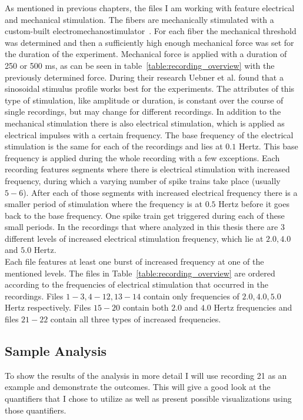 As mentioned in previous chapters, the files I am working with feature electrical and mechanical stimulation. The fibers are mechanically stimulated with a custom-built electromechanostimulator~\cite{roberto}. For each fiber the mechanical threshold was determined and then a sufficiently high enough mechanical force was set for the duration of the experiment.
Mechanical force is applied with a duration of 250 or 500 ms, as can be seen in table~\ref{table:recording_overview} with the previously determined force. During their research Uebner et al. found that a sinosoidal stimulus profile works best for the experiments. The attributes of this type of stimulation, like amplitude or duration, is constant over the course of single recordings, but may change  for different recordings. In addition to the mechanical stimulation there is also electrical stimulation, which is applied as electrical impulses with a certain frequency. The base frequency of the electrical stimulation is the same for each of the recordings and lies at $0.1$ Hertz. This base frequency is applied during the whole recording with a few exceptions. Each recording features segments where there is electrical stimulation with increased frequency, during which a varying number of spike trains take place (usually $5-6$). After each of those segments with increased electrical frequency there is a smaller period of stimulation where the frequency is at $0.5$ Hertz before it goes back to the base frequency. One spike train get triggered during each of these small periods. In the recordings that where analyzed in this thesis there are 3 different levels of increased electrical stimulation frequency, which lie at $2.0, 4.0$ and $5.0$ Hertz.\\
Each file features at least one burst of increased frequency at one of the mentioned levels. The files in Table~\ref{table:recording_overview} are ordered according to the frequencies of electrical stimulation that occurred in the recordings. Files $1-3, 4-12, 13-14$ contain only frequencies of $2.0, 4.0, 5.0$ Hertz respectively. Files $15-20$ contain both $2.0$ and $4.0$ Hertz frequencies and files $21-22$ contain all three types of increased frequencies.\\

\subsection{Sample Analysis}
To show the results of the analysis in more detail I will use recording 21 as an example and demonstrate the outcomes. This will give a good look at the quantifiers that I chose to utilize as well as present possible visualizations using those quantifiers.

